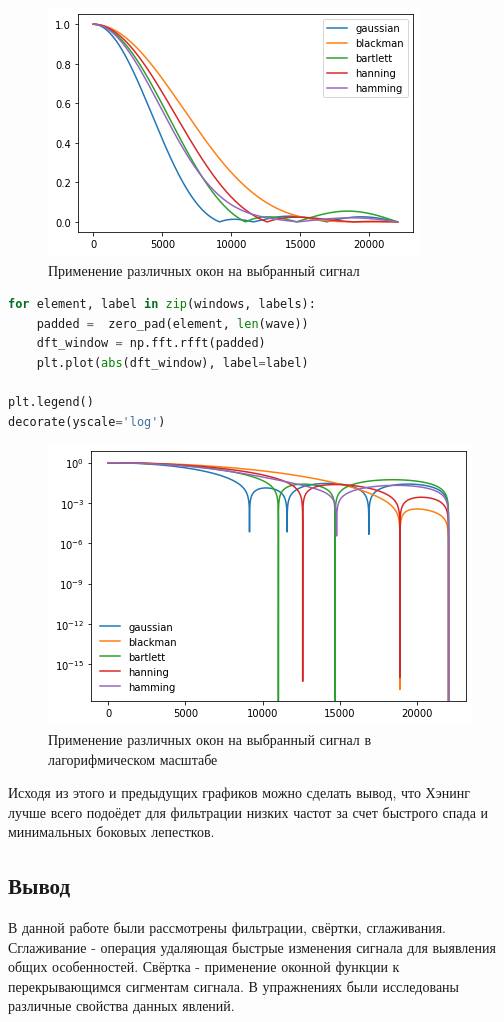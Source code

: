 \begin{figure}[H]
	\begin{center}
		\includegraphics[scale=1]{fig/lab08/lab08_08.png}
		\caption{Применение различных окон на выбранный сигнал}
	\end{center}
\end{figure}

\begin{lstlisting}[language=Python]
for element, label in zip(windows, labels):
    padded =  zero_pad(element, len(wave))
    dft_window = np.fft.rfft(padded)
    plt.plot(abs(dft_window), label=label)

plt.legend()
decorate(yscale='log')
\end{lstlisting}

\begin{figure}[H]
	\begin{center}
		\includegraphics[scale=1]{fig/lab08/lab08_09.png}
		\caption{Применение различных окон на выбранный сигнал в лагорифмическом масштабе}
	\end{center}
\end{figure}

Исходя из этого и предыдущих графиков можно сделать вывод, что Хэнинг лучше всего подоёдет для фильтрации низких частот за счет быстрого спада и минимальных боковых лепестков.


\subsection{Вывод}

В данной работе были рассмотрены фильтрации, свёртки, сглаживания. Сглаживание - операция удаляющая быстрые изменения сигнала для выявления общих особенностей. Свёртка - применение оконной функции к перекрывающимся сигментам сигнала. В упражнениях были исследованы различные свойства данных явлений.
